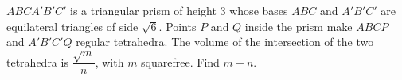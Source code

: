 $ABCA'B'C'$ is a triangular prism of height $3$ whose bases $ABC$ and $A'B'C'$ are equilateral triangles of side $\sqrt6$. Points $P$ and $Q$ inside the prism make $ABCP$ and $A'B'C'Q$ regular tetrahedra. The volume of the intersection of the two tetrahedra is $\dfrac{\sqrt m}n$, with $m$ squarefree. Find $m+n$.
